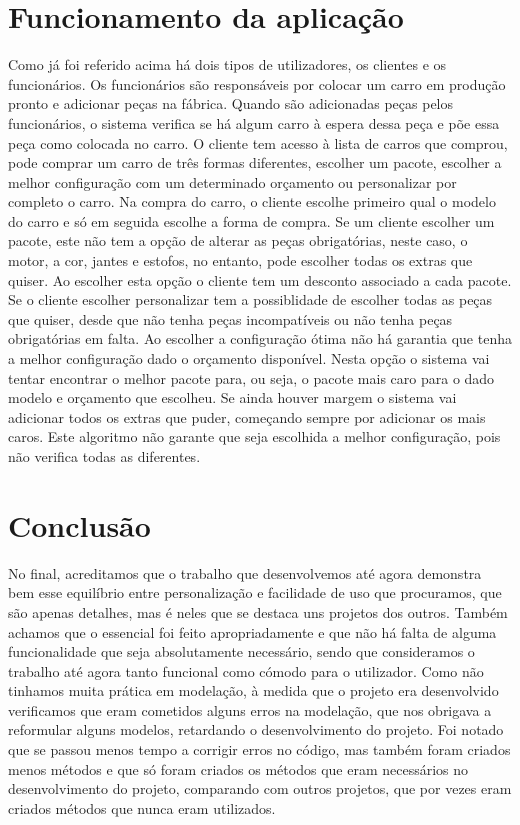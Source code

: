 \documentclass[10pt, a4paper]{article}
\begin{document}
\section{Funcionamento da aplicação}
Como já foi referido acima há dois tipos de utilizadores, os clientes e os funcionários. Os funcionários são responsáveis por colocar um carro em produção pronto e adicionar peças na fábrica. Quando são adicionadas peças pelos funcionários, o sistema verifica se há algum carro à espera dessa peça e põe essa peça como colocada no carro. O cliente tem acesso à lista de carros que comprou, pode comprar um carro de três formas diferentes, escolher um pacote, escolher a melhor configuração com um determinado orçamento ou personalizar por completo o carro. Na compra do carro, o cliente escolhe primeiro qual o modelo do carro e só em seguida escolhe a forma de compra. Se um cliente escolher um pacote, este não tem a opção de alterar as peças obrigatórias, neste caso, o motor, a cor, jantes e estofos, no entanto, pode escolher todas os extras que quiser. Ao escolher esta opção o cliente tem um desconto associado a cada pacote. Se o cliente escolher personalizar tem a possiblidade de escolher todas as peças que quiser, desde que não tenha peças incompatíveis ou não tenha peças obrigatórias em falta. Ao escolher a configuração ótima não há garantia que tenha a melhor configuração dado o orçamento disponível. Nesta opção o sistema vai tentar encontrar o melhor pacote para, ou seja, o pacote mais caro para o dado modelo e orçamento que escolheu. Se ainda houver margem o sistema vai adicionar todos os extras que puder, começando sempre por adicionar os mais caros. Este algoritmo não garante que seja escolhida a melhor configuração, pois não verifica todas as diferentes.

\newpage
\section{Conclusão}\label{analise}
No final, acreditamos que o trabalho que desenvolvemos até agora demonstra bem esse equilíbrio entre personalização e facilidade de uso que procuramos, que são apenas detalhes, mas é neles que se destaca uns projetos dos outros. Também achamos que o essencial foi feito apropriadamente e que não há falta de alguma funcionalidade que seja absolutamente necessário, sendo que consideramos o trabalho até agora tanto funcional como cómodo para o utilizador. Como não tinhamos muita prática em modelação, à medida que o projeto era desenvolvido verificamos que eram cometidos alguns erros na modelação, que nos obrigava a reformular alguns modelos, retardando o desenvolvimento do projeto. Foi notado que se passou menos tempo a corrigir erros no código, mas também foram criados menos métodos e que só foram criados os métodos que eram necessários no desenvolvimento do projeto, comparando com outros projetos, que por vezes eram criados métodos que nunca eram utilizados.
\end{document}
